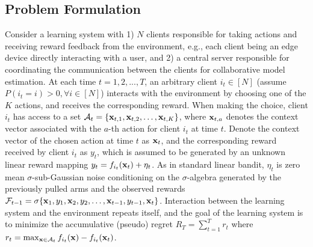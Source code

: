 \subsection{Problem Formulation} \label{subsec:problem_formulation}
Consider a learning system with 1) $N$ clients responsible for taking actions and receiving reward feedback from the environment, e.g., each client being an edge device directly interacting with a user, and 2) a central server responsible for coordinating the communication between the clients for collaborative model estimation. 
At each time $t=1,2,...,T$, an arbitrary client $i_{t} \in [N]$ (assume $P(i_{t}=i)>0,\forall i \in [N]$) interacts with the environment by choosing one of the $K$ actions, and receives the corresponding reward. When making the choice, client $i_{t}$ has access to a set $\mathcal{A}_{t}=\{\mathbf{x}_{t,1}, \mathbf{x}_{t,2}, \dots, \mathbf{x}_{t,K}\}$, where $\mathbf{x}_{t, a}$ denotes the context vector associated with the $a$-th action for client $i_{t}$ at time $t$. Denote the context vector of the chosen action at time $t$ as $\mathbf{x}_{t}$,
and the corresponding reward received by client $i_{t}$ as $y_{t}$, which is assumed to be generated by an unknown linear reward mapping $y_{t}=f_{i_{t}}(\mathbf{x}_{t})+\eta_{t}$. As in standard linear bandit, $\eta_{t}$ is zero mean $\sigma$-sub-Gaussian noise conditioning on the $\sigma$-algebra generated by the previously pulled arms and the observed rewards $\mathcal{F}_{t-1}=\sigma\{\mathbf{x}_{1},y_{1},\mathbf{x}_{2},y_{2},\dots,\mathbf{x}_{t-1},y_{t-1},\mathbf{x}_{t}\}$. Interaction between the learning system and the environment repeats itself, and the goal of the learning system is to minimize the accumulative (pseudo) regret $R_{T}=\sum_{t=1}^{T}r_{t}$ where $r_{t}=\max_{\mathbf{x} \in \mathcal{A}_{t}}f_{i_{t}}(\mathbf{x})-f_{i_{t}}(\mathbf{x}_{t})$. 

